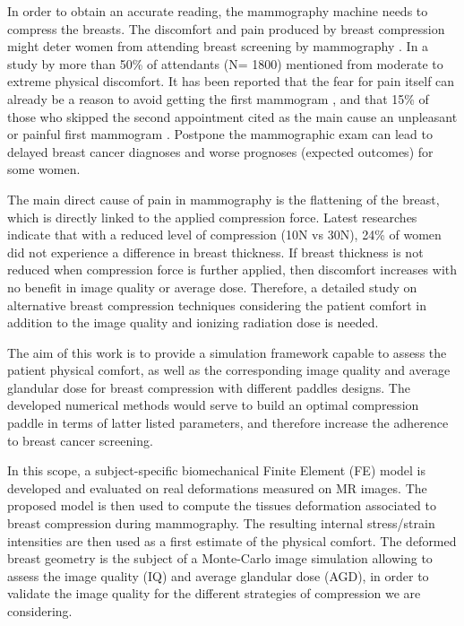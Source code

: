 In order to obtain an accurate reading, the mammography machine needs to compress the breasts.  The discomfort and pain produced by breast compression might deter women from attending breast screening by mammography  \citep{aro_psychosocial_1999,fleming_intermittent_2013}. In a study by \citep{dullum_rates_2000} more than 50\% of attendants (N= 1800) mentioned from moderate to extreme physical discomfort.  It has been reported that the
fear for pain itself can already be a reason to avoid getting the first mammogram \citep{andrews_pain_2001}, and that 15\% of those who skipped the second appointment cited as the main cause an unpleasant or painful first mammogram \citep{fleming_intermittent_2013,whelehan_effect_2013}.  Postpone the mammographic exam can lead to delayed breast cancer diagnoses and worse prognoses (expected outcomes) for some women.

The main direct cause of pain in mammography is the flattening of the breast, which is directly linked to the applied compression force. Latest researches indicate that with a reduced level of compression (10N vs 30N), 24\% of women did not experience a difference in breast thickness. If breast thickness is not reduced when compression force is further applied, then discomfort increases with no benefit in image quality or average dose. Therefore, a detailed study on alternative breast compression techniques considering the patient comfort in addition to the image quality and ionizing radiation dose is needed.

The aim of this work is to provide a simulation framework capable to assess the patient physical comfort, as well as the corresponding image quality and average glandular dose for breast compression with different paddles designs. The developed numerical methods would serve to build an optimal compression paddle in terms of latter listed parameters, and therefore increase the adherence to breast cancer screening. 

In this scope, a subject-specific biomechanical Finite Element (FE) model is developed and evaluated on real deformations measured on MR images. The proposed model is then used to compute the tissues deformation associated to breast compression during mammography.  The resulting internal stress/strain intensities are then used as a first estimate of the physical comfort. The deformed breast geometry is the subject of a Monte-Carlo image simulation allowing to assess the image quality (IQ) and average glandular dose (AGD), in order to validate the image quality for the different strategies of compression we are considering.




